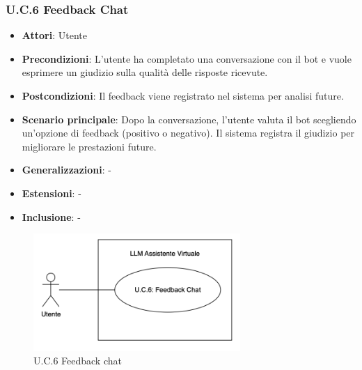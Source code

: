 \subsubsection{U.C.6 Feedback Chat}
\begin{itemize}
    \item \textbf{Attori}: Utente
    \item \textbf{Precondizioni}: L'utente ha completato una conversazione con il bot e vuole esprimere un giudizio sulla qualità delle risposte ricevute.
    \item \textbf{Postcondizioni}: Il feedback viene registrato nel sistema per analisi future.
    \item \textbf{Scenario principale}: Dopo la conversazione, l'utente valuta il bot scegliendo un'opzione di feedback (positivo o negativo). Il sistema registra il giudizio per migliorare le prestazioni future.
    \item \textbf{Generalizzazioni}: -
    \item \textbf{Estensioni}: -
    \item \textbf{Inclusione}: -
\end{itemize}
\begin{figure}[H]
    \centering
    \includegraphics[width=0.7\textwidth]{img/U.C.6.png}
    \caption{U.C.6 Feedback chat}
\end{figure}
\newpage

